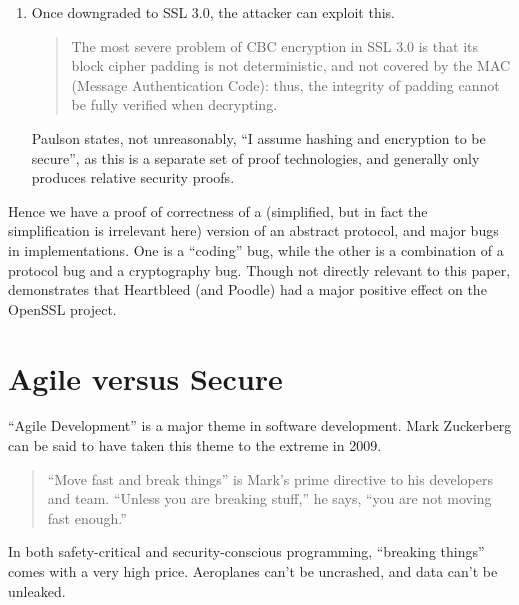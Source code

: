 \documentclass{llncs}
\begin{document}
\begin{description}
\begin{enumerate}
\item Once downgraded to SSL 3.0, the attacker can exploit this.
\begin{quote}
The most severe problem of CBC encryption in SSL 3.0 is that its block cipher padding is
not deterministic, and not covered by the MAC (Message Authentication Code): thus, the
integrity of padding cannot be fully verified when decrypting. \cite{Molleretal2014a}
\end{quote}
Paulson \cite{Paulson1999} states, not unreasonably, ``I assume hashing and encryption to be secure'', as this is a separate set of proof technologies, and generally only produces relative security proofs.
\end{enumerate}
\end{description}
Hence we have a proof of correctness of a (simplified, but in fact the simplification is irrelevant here) version of an abstract protocol, and major bugs in implementations. One is a ``coding'' bug, while the other is a combination of a protocol bug and a cryptography bug.  Though not directly relevant to this paper, \cite{Salz2017a} demonstrates that Heartbleed (and Poodle) had a major positive effect on the OpenSSL project.
\fi
\section{Agile versus Secure}
``Agile Development'' \cite{Becketal2001} is a major theme in software development. 
Mark Zuckerberg can be said to have taken this theme to the extreme in 2009.
\begin{quote}
``Move fast and break things'' is Mark's prime directive to his developers and team. ``Unless you are breaking stuff,'' he says, ``you are not moving fast enough.''  \cite{Blodget2009a}
\end{quote}
In both safety-critical and security-conscious programming, ``breaking things'' comes with a very high price. Aeroplanes can't be uncrashed, and data can't be unleaked. 
\end{document}
